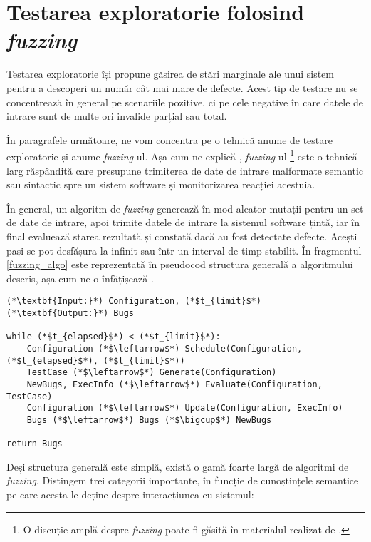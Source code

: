 \section{Testarea exploratorie folosind \emph{fuzzing}}

Testarea exploratorie își propune găsirea de stări marginale ale unui sistem pentru a descoperi un număr cât mai mare de defecte. Acest tip de testare nu se concentrează în general pe scenariile pozitive, ci pe cele negative în care datele de intrare sunt de multe ori invalide parțial sau total.

În paragrafele următoare, ne vom concentra pe o tehnică anume de testare exploratorie și anume \textit{fuzzing}-ul. Așa cum ne explică \citet{Manes2021}, \textit{fuzzing}-ul \footnote{O discuție amplă despre \textit{fuzzing} poate fi găsită în materialul realizat de .} este o tehnică larg răspândită care presupune trimiterea de date de intrare malformate semantic sau sintactic spre un sistem software și monitorizarea reacției acestuia. 

În general, un algoritm de \textit{fuzzing} generează în mod aleator mutații pentru un set de date de intrare, apoi trimite datele de intrare la sistemul software țintă, iar în final evaluează starea rezultată și constată dacă au fost detectate defecte. Acești pași se pot desfășura la infinit sau într-un interval de timp stabilit. În fragmentul \ref{fuzzing_algo} este reprezentată în pseudocod structura generală a algoritmului descris, așa cum ne-o înfățișează \citet{Manes2021}.

\begin{lstlisting}[label={fuzzing_algo}, caption={Structura generală a unui algoritm de fuzzing}]
(*\textbf{Input:}*) Configuration, (*$t_{limit}$*)
(*\textbf{Output:}*) Bugs

while (*$t_{elapsed}$*) < (*$t_{limit}$*):
    Configuration (*$\leftarrow$*) Schedule(Configuration, (*$t_{elapsed}$*), (*$t_{limit}$*))
    TestCase (*$\leftarrow$*) Generate(Configuration)
    NewBugs, ExecInfo (*$\leftarrow$*) Evaluate(Configuration, TestCase)
    Configuration (*$\leftarrow$*) Update(Configuration, ExecInfo)
    Bugs (*$\leftarrow$*) Bugs (*$\bigcup$*) NewBugs
    
return Bugs
\end{lstlisting}

Deși structura generală este simplă, există o gamă foarte largă de algoritmi de \textit{fuzzing}. Distingem trei categorii importante, în funcție de cunoștințele semantice pe care acesta le deține despre interacțiunea cu sistemul:

